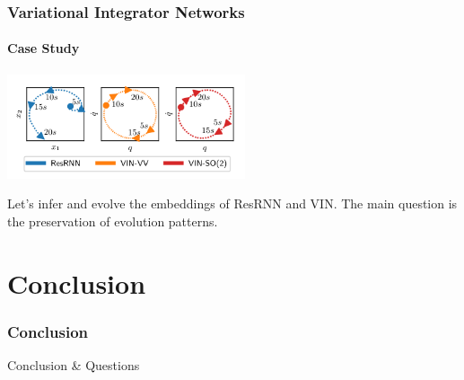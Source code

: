 \documentclass[
    11pt, %
    aspectratio=169, ]{beamer}%
\begin{document}
\begin{frame}
    \frametitle{Variational Integrator Networks}
    \framesubtitle{Case Study}

    \begin{multicols}{2}
        \includegraphics[width=7cm]{assets/rnn-vin.png}

        Let's infer and evolve the embeddings of ResRNN and VIN\@. The main question is
        the preservation of evolution patterns.
    \end{multicols}

\end{frame}

\section{Conclusion}

\begin{frame}
    \frametitle{Conclusion}
    \centering
    \LARGE{Conclusion \& Questions}

\end{frame}




\end{document}
